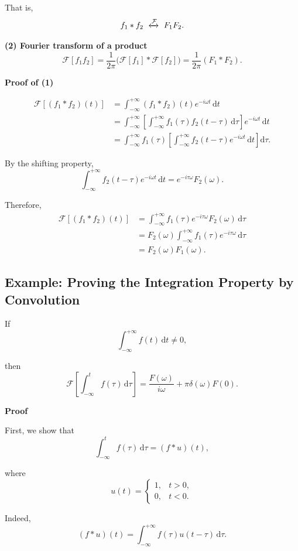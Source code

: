 \documentclass[11pt,a4paper]{article}
\theoremstyle{definition}
\theoremstyle{plain}
\begin{document}
That is,
\[
f_1*f_2
\ \xleftrightarrow{\mathcal F}\
F_1F_2.
\]

\textbf{(2) Fourier transform of a product}
\[
\mathcal F[f_1f_2]
=\frac1{2\pi}\bigl(\mathcal F[f_1]*\mathcal F[f_2]\bigr)
=\frac1{2\pi}(F_1*F_2).
\]

\textbf{Proof of (1)}\par\nopagebreak[4]
\[
\begin{aligned}
\mathcal F[(f_1*f_2)(t)]
&=\int_{-\infty}^{+\infty}
(f_1*f_2)(t)e^{-i\omega t}\,\mathrm dt\\
&=\int_{-\infty}^{+\infty}
\left[
\int_{-\infty}^{+\infty}
f_1(\tau)f_2(t-\tau)\,\mathrm d\tau
\right]e^{-i\omega t}\,\mathrm dt\\
&=\int_{-\infty}^{+\infty}
f_1(\tau)
\left[
\int_{-\infty}^{+\infty}
f_2(t-\tau)e^{-i\omega t}\,\mathrm dt
\right]\mathrm d\tau.
\end{aligned}
\]

By the shifting property,
\[
\int_{-\infty}^{+\infty}
f_2(t-\tau)e^{-i\omega t}\,\mathrm dt
=e^{-i\tau\omega}F_2(\omega).
\]

Therefore,
\[
\begin{aligned}
\mathcal F[(f_1*f_2)(t)]
&=\int_{-\infty}^{+\infty}
f_1(\tau)e^{-i\tau\omega}F_2(\omega)\,\mathrm d\tau\\
&=F_2(\omega)
\int_{-\infty}^{+\infty}
f_1(\tau)e^{-i\tau\omega}\,\mathrm d\tau\\
&=F_2(\omega)F_1(\omega).
\end{aligned}
\]

\subsection{Example: Proving the Integration Property by Convolution}

If
\[
\int_{-\infty}^{+\infty}f(t)\,\mathrm dt\ne0,
\]

then
\[
\mathcal F\!\left[
\int_{-\infty}^{t}f(\tau)\,\mathrm d\tau
\right]
=\frac{F(\omega)}{i\omega}
+\pi\delta(\omega)F(0).
\]

\textbf{Proof}\par\nopagebreak[4]
First, we show that
\[
\int_{-\infty}^{t}f(\tau)\,\mathrm d\tau
=(f*u)(t),
\]

where
\[
u(t)=
\begin{cases}
1,&t>0,\\
0,&t<0.
\end{cases}
\]

Indeed,
\[
(f*u)(t)
=\int_{-\infty}^{+\infty}
f(\tau)u(t-\tau)\,\mathrm d\tau.
\]
\end{document}
